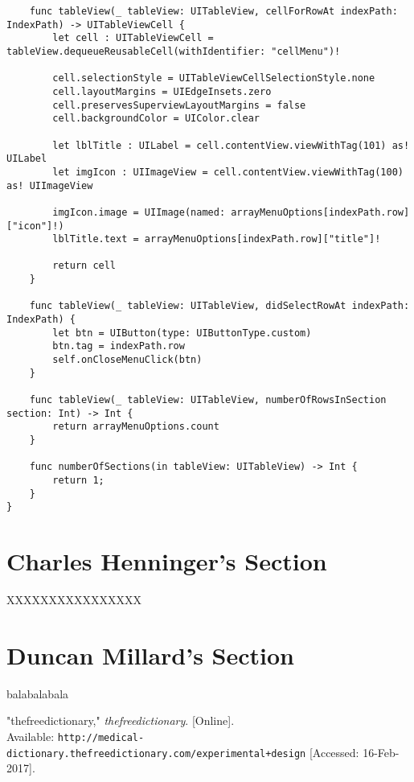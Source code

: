 \documentclass[letterpaper, 10pt,titlepage]{article}
\begin{document}
\begin{verbatim}
    func tableView(_ tableView: UITableView, cellForRowAt indexPath: IndexPath) -> UITableViewCell {
        let cell : UITableViewCell = tableView.dequeueReusableCell(withIdentifier: "cellMenu")!
        
        cell.selectionStyle = UITableViewCellSelectionStyle.none
        cell.layoutMargins = UIEdgeInsets.zero
        cell.preservesSuperviewLayoutMargins = false
        cell.backgroundColor = UIColor.clear
        
        let lblTitle : UILabel = cell.contentView.viewWithTag(101) as! UILabel
        let imgIcon : UIImageView = cell.contentView.viewWithTag(100) as! UIImageView
        
        imgIcon.image = UIImage(named: arrayMenuOptions[indexPath.row]["icon"]!)
        lblTitle.text = arrayMenuOptions[indexPath.row]["title"]!
        
        return cell
    }
    
    func tableView(_ tableView: UITableView, didSelectRowAt indexPath: IndexPath) {
        let btn = UIButton(type: UIButtonType.custom)
        btn.tag = indexPath.row
        self.onCloseMenuClick(btn)
    }
    
    func tableView(_ tableView: UITableView, numberOfRowsInSection section: Int) -> Int {
        return arrayMenuOptions.count
    }
    
    func numberOfSections(in tableView: UITableView) -> Int {
        return 1;
    }
}

\end{verbatim}


\vspace{0.5cm}


\section{Charles Henninger's Section}
XXXXXXXXXXXXXXXX

\vspace{0.5cm}

\section{Duncan Millard's Section}

balabalabala







\newpage %
\begin{thebibliography}{9}

"thefreedictionary," \textit{thefreedictionary}. [Online]. \\Available:
\texttt{http://medical-dictionary.thefreedictionary.com/experimental+design} [Accessed: 16-Feb-2017].

\end{thebibliography}
\end{document}
